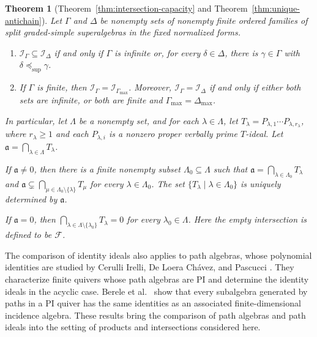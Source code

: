 \documentclass[11pt,reqno]{amsart}
\newtheorem{maintheorem}{Theorem}
\newcommand{\F}{\mathcal F}
\theoremstyle{definition}
\theoremstyle{remark}
\numberwithin{equation}{section}
\begin{document}
\begin{maintheorem}[Theorem~\ref{thm:intersection-capacity} and Theorem~\ref{thm:unique-antichain}]
\label{main:intersections}
Let $\Gamma$ and $\Delta$ be nonempty sets of nonempty
finite ordered families of split graded-simple
superalgebras in the fixed normalized forms.
\begin{enumerate}
\item
$\mathcal I_\Gamma\subseteq\mathcal I_\Delta$
if and only if $\Gamma$ is infinite or, for every
$\delta\in\Delta$, there is $\gamma\in\Gamma$ with
$\delta\preceq_{\mathrm{sup}}\gamma$.
\item
If $\Gamma$ is finite, then
$\mathcal I_\Gamma=\mathcal I_{\Gamma_{\max}}$.
Moreover, $\mathcal I_\Gamma=\mathcal I_\Delta$ if and
only if either both sets are infinite, or both are
finite and $\Gamma_{\max}=\Delta_{\max}$.
\end{enumerate}


In particular, let $\Lambda$ be a nonempty set, and for
each $\lambda\in\Lambda$, let
$T_\lambda=P_{\lambda,1}\cdots P_{\lambda,r_\lambda}$,
where $r_\lambda\geq1$ and each $P_{\lambda,i}$ is a
nonzero proper verbally prime $T$-ideal.
Let $\mathfrak a=\bigcap_{\lambda\in\Lambda}T_\lambda$.

If $\mathfrak a\ne0$, then there is a finite nonempty
subset $\Lambda_0\subseteq\Lambda$ such that
$\mathfrak a=\bigcap_{\lambda\in\Lambda_0}T_\lambda$
and
$\mathfrak a\subsetneq
\bigcap_{\mu\in\Lambda_0\setminus\{\lambda\}}T_\mu$
for every $\lambda\in\Lambda_0$.
The set $\{T_\lambda\mid\lambda\in\Lambda_0\}$
is uniquely determined by $\mathfrak a$.

If $\mathfrak a=0$, then
$\bigcap_{\lambda\in\Lambda\setminus\{\lambda_0\}}
T_\lambda=0$
for every $\lambda_0\in\Lambda$.
Here the empty intersection is defined to be $\F$.


\end{maintheorem}


The comparison of identity ideals also applies to path
algebras, whose polynomial identities are studied by
Cerulli Irelli, De Loera Ch\'avez, and Pascucci
\cite{CerulliIrelliEtAl2026}.
They characterize finite quivers whose path algebras are
PI and determine the identity ideals in the acyclic case.
Berele et al.~\cite{BereleEtAl2026} show that every
subalgebra generated by paths in a PI quiver has the same
identities as an associated finite-dimensional incidence
algebra.
These results bring the comparison of path algebras
and path ideals into the setting of products and
intersections considered here.
\end{document}
